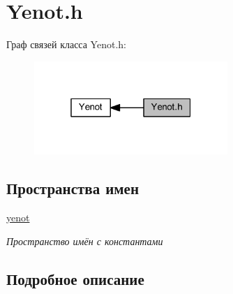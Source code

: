\hypertarget{group__yenoth}{}\section{Yenot.\+h}
\label{group__yenoth}
Граф связей класса Yenot.\+h\+:\nopagebreak
\begin{figure}[H]
\begin{center}
\leavevmode
\includegraphics[width=208pt]{group__yenoth}
\end{center}
\end{figure}
\subsection*{Пространства имен}
\begin{DoxyCompactItemize}
\item 
 \mbox{\hyperlink{namespaceyenot}{yenot}}
\begin{DoxyCompactList}\small\item\em Пространство имён с константами \end{DoxyCompactList}\end{DoxyCompactItemize}


\subsection{Подробное описание}
